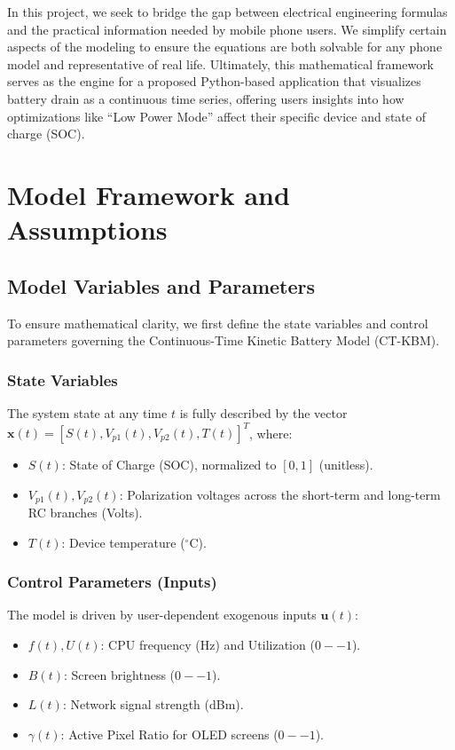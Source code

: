 \documentclass[12pt]{article}
\begin{document}
In this project, we seek to bridge the gap between electrical engineering formulas and the practical information needed by mobile phone users. We simplify certain aspects of the modeling to ensure the equations are both solvable for any phone model and representative of real life. Ultimately, this mathematical framework serves as the engine for a proposed Python-based application that visualizes battery drain as a continuous time series, offering users insights into how optimizations like ``Low Power Mode'' affect their specific device and state of charge (SOC).


\section{Model Framework and Assumptions}

\subsection{Model Variables and Parameters}

To ensure mathematical clarity, we first define the state variables and control parameters governing the Continuous-Time Kinetic Battery Model (CT-KBM).

\subsubsection*{State Variables}
The system state at any time $t$ is fully described by the vector $\mathbf{x}(t) = [S(t), V_{p1}(t), V_{p2}(t), T(t)]^T$, where:
\begin{itemize}
    \item \textbf{$S(t)$}: State of Charge (SOC), normalized to $[0,1]$ (unitless).
    \item \textbf{$V_{p1}(t), V_{p2}(t)$}: Polarization voltages across the short-term and long-term RC branches (Volts).
    \item \textbf{$T(t)$}: Device temperature ($^\circ$C).
\end{itemize}

\subsubsection*{Control Parameters (Inputs)}
The model is driven by user-dependent exogenous inputs $\mathbf{u}(t)$:
\begin{itemize}
    \item \textbf{$f(t), U(t)$}: CPU frequency (Hz) and Utilization ($0--1$).
    \item \textbf{$B(t)$}: Screen brightness ($0--1$).
    \item \textbf{$L(t)$}: Network signal strength (dBm).
    \item \textbf{$\gamma(t)$}: Active Pixel Ratio for OLED screens ($0--1$).
\end{itemize}
\end{document}
